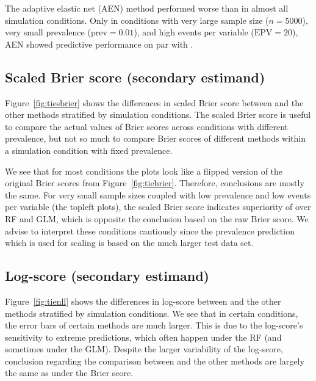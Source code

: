 The adaptive elastic net (AEN) method performed worse than \ainet{} in almost
all simulation conditions. Only in conditions with very large sample size
($n = 5000$), very small prevalence ($\mbox{prev} = 0.01$), and high events per
variable ($\mbox{EPV} = 20$), AEN showed predictive performance on par with
\ainet{}.

\subsection{Scaled Brier score (secondary estimand)}
Figure~\ref{fig:tiesbrier} shows the differences in scaled Brier score between
\ainet{} and the other methods stratified by simulation conditions. The scaled
Brier score is useful to compare the actual values of Brier scores across
conditions with different prevalence, but not so much to compare Brier scores of
different methods within a simulation condition with fixed prevalence.

We see that for most conditions the plots look like a flipped version of the
original Brier scores from Figure~\ref{fig:tiebrier}. Therefore, conclusions are
mostly the same. For very small sample sizes coupled with low prevalence and low
events per variable (the topleft plots), the scaled Brier score indicates
superiority of \ainet{} over RF and GLM, which is opposite the conclusion based
on the raw Brier score. We advise to interpret these conditions cautiously since
the prevalence prediction which is used for scaling is based on the much larger
test data set.

\subsection{Log-score (secondary estimand)}
Figure~\ref{fig:tienll} shows the differences in log-score between \ainet{} and
the other methods stratified by simulation conditions. We see that in certain
conditions, the error bars of certain methods are much larger. This is due to
the log-score's sensitivity to extreme predictions, which often happen under the
RF (and sometimes under the GLM). Despite the larger variability of the log-score, 
conclusion regarding the comparison between \ainet{} and the other
methods are largely the same as under the Brier score.

